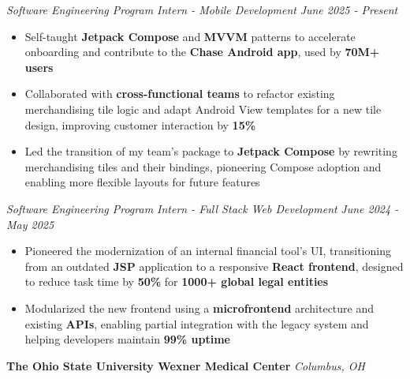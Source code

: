 \documentclass[letterpaper]{article}
\newenvironment{tightitemize}{%
  \begin{itemize}\small\setlength{\baselineskip}{0.95\baselineskip}\itemsep -1mm%
}{\end{itemize}}
\begin{document}
    \textit{Software Engineering Program Intern - Mobile Development} \hfill \textsl{June 2025 - Present}\\
    \vspace{-7pt}
    \begin{tightitemize} \itemsep -1mm

            \item Self-taught \textbf{Jetpack Compose} and \textbf{MVVM} patterns to accelerate onboarding and contribute to the \textbf{Chase Android app}, used by \textbf{70M+ users}
            
            \item Collaborated with \textbf{cross-functional teams} to refactor existing merchandising tile logic and adapt Android View templates for a new tile design, improving customer interaction by \textbf{15\%}
            
            \item Led the transition of my team's package to \textbf{Jetpack Compose} by rewriting merchandising tiles and their bindings, pioneering Compose adoption and enabling more flexible layouts for future features
                    
    \end{tightitemize}
    \textit{Software Engineering Program Intern - Full Stack Web Development} \hfill \textsl{June 2024 - May 2025}\\
    \vspace{-7pt}
    \begin{tightitemize} \itemsep -1mm

            \item Pioneered the modernization of an internal financial tool's UI, transitioning from an outdated \textbf{JSP} application to a responsive \textbf{React frontend}, designed to reduce task time by \textbf{50\%} for \textbf{1000+ global legal entities}

            \item Modularized the new frontend using a \textbf{microfrontend} architecture and existing \textbf{APIs}, enabling partial integration with the legacy system and helping developers maintain \textbf{99\% uptime}
                    
    \end{tightitemize}
    \vspace{-2mm}

    \textbf{The Ohio State University Wexner Medical Center} \hfill \textsl{Columbus, OH}\\
    
\end{document}
